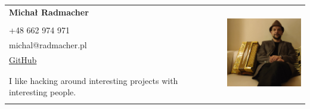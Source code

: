 \documentclass[a4paper]{article}
\begin{document}
\begin{tabular}{p{7cm}r}
\textbf{Michał Radmacher}&\multirow{10}{*}{\includegraphics[width=40mm]{mr.jpg}}\\
&\\
+48 662 974 971&\\
michal@radmacher.pl&\\
\href{https://github.com/mradmacher/}{GitHub}\\
&\\
&\\
I like hacking around interesting projects with interesting people.
&\\
&
\end{tabular}

\subsection*{}
\end{document}
